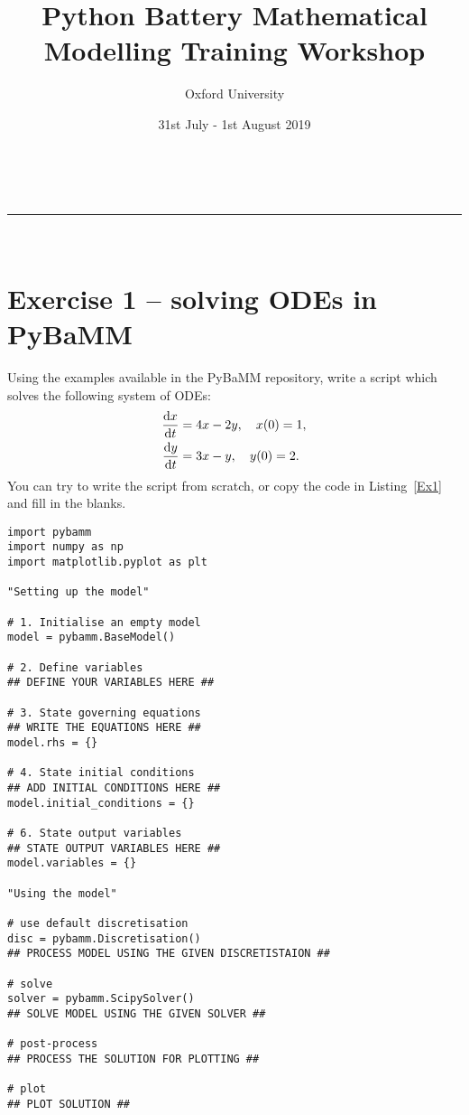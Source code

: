 \documentclass[a4paper,11pt]{article}
\makeatletter
\newcommand{\linia}{\rule{\linewidth}{0.5pt}}
\renewcommand{\maketitle}{
\begin{center}
\vspace{2ex}
{\huge \textsc{\@title}}
\vspace{1ex}
\\
\linia\\
\@author \hfill \@date
\vspace{4ex}
\end{center}
}
\makeatother
\begin{document}
\title{\textbf{P}ython \textbf{Ba}ttery \textbf{M}athematical \textbf{M}odelling Training Workshop}

\author{Oxford University}

\date{31st July - 1st August 2019}

\maketitle

\section*{Exercise 1 -- solving ODEs in PyBaMM}

Using the examples available in the PyBaMM repository, write a script which solves the following system of ODEs:
\begin{align*}
  \dv{x}{t} &= 4x - 2y, \quad x(0) = 1, \\
  \dv{y}{t} &= 3x - y, \quad y(0) = 2.
\end{align*}
You can try to write the script from scratch, or copy the code in Listing~\ref{Ex1} and fill in the blanks.


\begin{lstlisting}[label={Ex1},caption=Solving ODEs script]
import pybamm
import numpy as np
import matplotlib.pyplot as plt

"Setting up the model"

# 1. Initialise an empty model
model = pybamm.BaseModel()

# 2. Define variables
## DEFINE YOUR VARIABLES HERE ##

# 3. State governing equations
## WRITE THE EQUATIONS HERE ##
model.rhs = {}

# 4. State initial conditions
## ADD INITIAL CONDITIONS HERE ##
model.initial_conditions = {}

# 6. State output variables
## STATE OUTPUT VARIABLES HERE ##
model.variables = {}

"Using the model"

# use default discretisation
disc = pybamm.Discretisation()
## PROCESS MODEL USING THE GIVEN DISCRETISTAION ##

# solve
solver = pybamm.ScipySolver()
## SOLVE MODEL USING THE GIVEN SOLVER ##

# post-process
## PROCESS THE SOLUTION FOR PLOTTING ##

# plot
## PLOT SOLUTION ##
\end{lstlisting}
\end{document}
